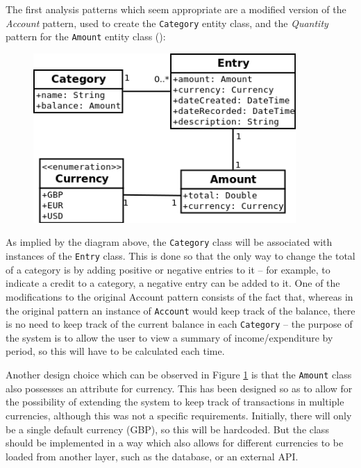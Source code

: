 The first analysis patterns which seem appropriate are a modified version of
the \emph{Account} pattern, used to create the \texttt{Category} entity class,
and the \emph{Quantity} pattern for the \texttt{Amount} entity class
(\cite[][Sections~6.1~\&~3.1]{fowler1997analysis}):
\begin{figure}[ht!]
  \begin{center}
    \includegraphics[width=10cm]{./contents/img/Class_Diagram_-_Categories_and_Amount.png}
  \end{center}
  \caption{}
  \label{fig:ClassDiagram.CategoriesAndAmount}
\end{figure}
\FloatBarrier

As implied by the diagram above, the \texttt{Category} class will be associated
with instances of the \texttt{Entry} class. This is done so that the only way to
change the total of a category is by adding positive or negative entries to it
-- for example, to indicate a credit to a category, a negative entry can be
added to it. One of the modifications to the original Account pattern consists
of the fact that, whereas in the original pattern an instance of
\texttt{Account} would keep track of the balance, there is no need to keep
track of the current balance in each \texttt{Category} -- the purpose of the
system is to allow the user to view a summary of income/expenditure by period,
so this will have to be calculated each time.

Another design choice which can be observed in Figure
\ref{fig:ClassDiagram.CategoriesAndAmount} is that the \texttt{Amount} class
also possesses an attribute for currency. This has been designed so as to allow
for the possibility of extending the system to keep track of transactions in
multiple currencies, although this was not a specific requirements. Initially,
there will only be a single default currency (GBP), so this will be hardcoded.
But the class should be implemented in a way which also allows for different
currencies to be loaded from another layer, such as the database, or an
external API.

